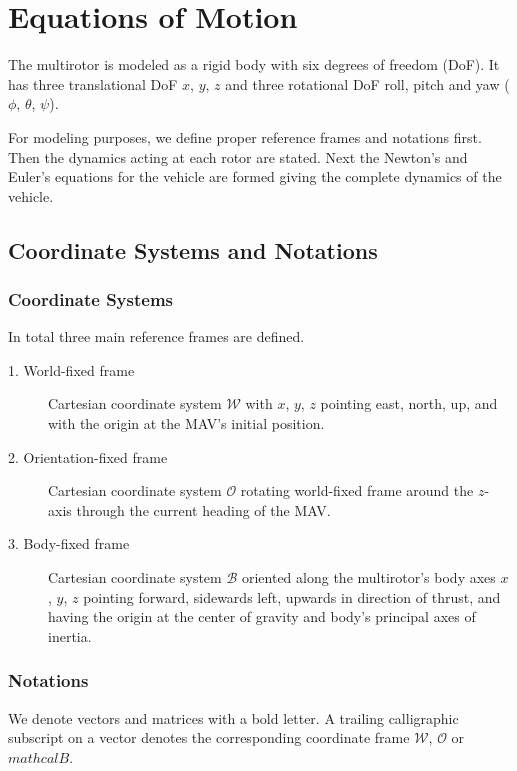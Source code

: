 \section{Equations of Motion}
\label{sec:eq_of_motion}
The multirotor is modeled as a rigid body with six degrees of freedom (DoF). It has three translational DoF $x$, $y$, $z$ and three rotational DoF roll, pitch and yaw ($\phi$, $\theta$, $\psi$).

 For modeling purposes, we define proper reference frames and notations first. Then the dynamics acting at each rotor are stated. Next the Newton's and Euler's equations for the vehicle are formed giving the complete dynamics of the vehicle.

\subsection{Coordinate Systems and Notations}
\label{sec:coordinates}
\subsubsection{Coordinate Systems}
In total three main reference frames are defined. 
\begin{description}
\item[1. World-fixed frame] Cartesian coordinate system $\mathcal{W}$ with $x$, $y$, $z$ pointing east, north, up, and with the origin at the MAV's initial position.
\item[2. Orientation-fixed frame] Cartesian coordinate system $\mathcal{O}$ rotating world-fixed frame around the $z$-axis through the current heading of the MAV. 
\item[3. Body-fixed frame] Cartesian coordinate system $\mathcal{B}$ oriented along the multirotor's body axes $x$, $y$, $z$ pointing forward, sidewards left, upwards in direction of thrust, and having the origin at the center of gravity and body's principal axes of inertia.
\end{description}

\subsubsection{Notations}
We denote vectors and matrices with a bold letter. A trailing calligraphic subscript on a vector denotes the corresponding coordinate frame $\mathcal{W}$, $\mathcal{O}$ or $mathcal{B}$. 

